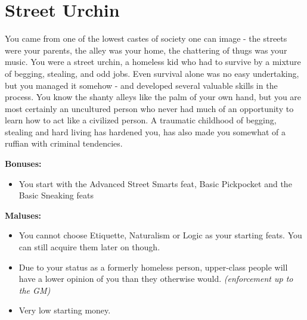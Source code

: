 \section{Street Urchin}
You came from one of the lowest castes of society one can image - the streets were your parents, the alley was your home, the chattering of thugs was your music. You were a street urchin, a homeless kid who had to survive by a mixture of begging, stealing, and odd jobs. Even survival alone was no easy undertaking, but you managed it somehow - and developed several valuable skills in the process. You know the shanty alleys like the palm of your own hand, but you are most certainly an uncultured person who never had much of an opportunity to learn how to act like a civilized person. A traumatic childhood of begging, stealing and hard living has hardened you, has also made you somewhat of a ruffian with criminal tendencies.


\textbf{Bonuses:}
\begin{itemize}
	\item You start with the Advanced Street Smarts feat, Basic Pickpocket and the Basic Sneaking feats
\end{itemize}


\textbf{Maluses:}
\begin{itemize}
	\item You cannot choose Etiquette, Naturalism or Logic as your starting feats. You can still acquire them later on though.
	\item Due to your status as a formerly homeless person, upper-class people will have a lower opinion of you than they otherwise would. \textit{(enforcement up to the GM)}
	\item Very low starting money.
\end{itemize}
